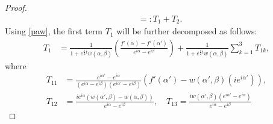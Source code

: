 \documentclass[10pt,a4paper]{amsart}
\begin{document}
\begin{proof}
\begin{align*}
        &=: T_1 + T_2.
    \end{align*}
    Using \eqref{paw}, the first term $T_1$ will be further decomposed as follows:
    \begin{align*}
        T_1 &= \frac{1}{1+ e^{\frac{i}{2}t}w(\alpha,\beta)}\left(\frac{f'(\alpha) - f'(\alpha')}{e^{i\alpha} - e^{i\beta}}\right) + \frac{1}{1+ e^{\frac{i}{2}t}w(\alpha,\beta)}\sum_{k=1}^3 T_{1k},
    \end{align*}
    where
    \begin{align*}
        T_{11} &=\frac{e^{i\alpha'} - e^{i\alpha}}{(e^{i\alpha} - e^{i\beta})(e^{i\alpha'} - e^{i\beta})}\left(f'(\alpha') - w(\alpha',\beta) (ie^{i\alpha'})\right),\\
        T_{12} &= \frac{ie^{i\alpha}(w(\alpha',\beta) - w(\alpha,\beta))}{e^{i\alpha}  -e^{i\beta}},\quad T_{13} = \frac{iw(\alpha',\beta)(e^{i\alpha'} - e^{i\alpha})}{e^{i\alpha}  -e^{i\beta}}
    \end{align*}
    
    
    

\end{proof}
\end{document}
